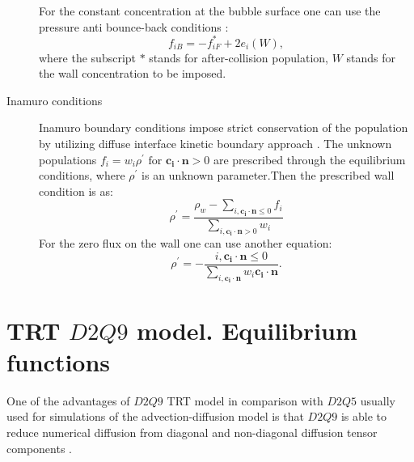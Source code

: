 \documentclass{article}
\begin{document}
\begin{description}
For the constant concentration at the bubble surface one can use the pressure anti
bounce-back conditions
\cite{ginzburg-boundary-main}:
\begin{equation}
f_{iB}=-f^{*}_{iF}+2 e_i(W),
\end{equation}
where the subscript $*$ stands for after-collision population, $W$ stands for the wall
concentration to be imposed.
\item[Inamuro conditions] Inamuro boundary conditions impose strict conservation of the population
by utilizing diffuse interface kinetic boundary approach \cite{inamuro-scalar-boundary}. The
unknown populations $f_i=w_i \rho^{\prime}\text{ for } \bm{c_i}\cdot \bm{n}>0$ are prescribed
through the equilibrium conditions, where $\rho^{\prime}$ is an unknown parameter.Then the
prescribed wall condition is as: 
\begin{equation}
\rho^{\prime}=\frac{\rho_{w}-\sum_{i,\bm{c_i}\cdot\bm{n}\leq0}
f_i}{\sum_{i,\bm{c_i}\cdot\bm{n}>0}w_i}
\end{equation}
For the zero flux on the wall one can use another equation:
\begin{equation}
\rho^{\prime}=-\frac{i,\bm{c_i}\cdot\bm{n}\leq0}{\sum_{i,\bm{c_i}\cdot \bm{n}}{w_i \bm{c_i}\cdot
\bm{n}}}.
\end{equation}
\end{description}


\section{TRT $D2Q9$ model. Equilibrium functions}
One of the advantages of $D2Q9$ TRT model in comparison with $D2Q5$ usually used for simulations of
the advection-diffusion model is that $D2Q9$ is able to reduce numerical diffusion from diagonal
and non-diagonal diffusion tensor components \cite{kuzmin-stability-optimal}.
\end{document}
